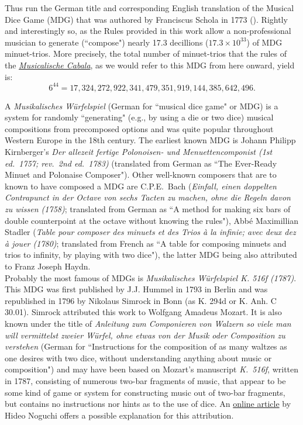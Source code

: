 \documentclass[a4paper,x11names,svgnames,10pt]{article}
\begin{document}
{Thus run the German title and corresponding English translation of the Musical Dice Game (MDG) that was authored by Franciscus Schola in 1773 (\citealp{schola1773}).  Rightly and interestingly so, as the Rules provided in this work allow a non-professional musician to generate (``compose") nearly 17.3 decillions ($17.3 \times 10^{33}$) of MDG minuet-trios.  More precisely, the total number of minuet-trios that the rules of the \href{https://imslp.org/wiki/Musicalische_Cabala_(Schola%2C_Franciscus)}{{\em Musicalische Cabala}}, as we would refer to this MDG from here onward, yield is: $$6^{44} = 17,324,272,922,341,479,351,919,144,385,642,496.$$

\noindent A {\it Musikalisches W\"{u}rfelspiel} (German for ``musical dice game" or MDG) is a system for randomly ``generating" (e.g., by using a die or two dice) musical compositions from precomposed options and was quite popular throughout Western Europe in the 18th century.  The earliest known MDG is Johann Philipp Kirnberger's {\em Der allezeit fertige Polonoisen- und Menuettencomponist (1st ed.\ 1757; rev.\ 2nd ed.\ 1783)} (translated from German as ``The Ever-Ready Minuet and Polonaise Composer").  Other well-known composers that are to known to have composed a MDG are C.P.E.\ Bach ({\em Einfall, einen doppelten Contrapunct in der Octave von sechs Tacten zu machen, ohne die Regeln davon zu wissen (1758)}; translated from German as ``A method for making six bars of double counterpoint at the octave without knowing the rules"), Abb\'{e} Maximillian Stadler ({\em Table pour composer des minuets et des Trios \`{a} la infinie; avec deux dez \`{a} jouer (1780)}; translated from French as ``A table for composing minuets and trios to infinity, by playing with two dice"), the latter MDG being also attributed to Franz Joseph Haydn.\\

Probably the most famous of MDGs is {\it Musikalisches W\"{u}rfelspiel K. 516f (1787)}.  This MDG was first published by J.J. Hummel in 1793 in Berlin and was republished in 1796 by Nikolaus Simrock in Bonn (as K. 294d or K. Anh. C 30.01). Simrock attributed this work to Wolfgang Amadeus Mozart. It is also known under the title of {\em Anleitung zum Componieren von Walzern so viele man will vermittelst zweier W\"{u}rfel, ohne etwas von der Musik oder Composition zu verstehen} (German for ``Instructions for the composition of as many waltzes as one desires with two dice, without understanding anything about music or composition") and may have been based on Mozart's manuscript {\em K.\ 516f}, written in 1787, consisting of numerous two-bar fragments of music, that appear to be some kind of game or system for constructing music out of two-bar fragments, but contains no instructions nor hints as to the use of dice.  An \href{(http://www.asahi-net.or.jp/\~rb5h-ngc/e/k516f.htm}{online article} by Hideo Noguchi offers a possible explanation for this attribution.\\

}
\end{document}
